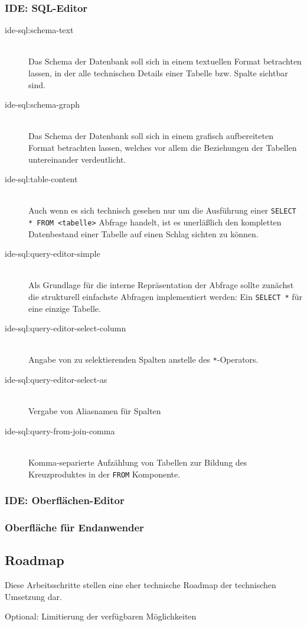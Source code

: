 \subsubsection{IDE: SQL-Editor}

\begin{description}
\item[ide-sql:schema-text] \hfill\\
  Das Schema der Datenbank soll sich in einem textuellen Format betrachten lassen, in der alle technischen Details einer Tabelle bzw. Spalte sichtbar sind.
\item[ide-sql:schema-graph] \hfill\\
  Das Schema der Datenbank soll sich in einem grafisch aufbereiteten Format betrachten lassen, welches vor allem die Beziehungen der Tabellen untereinander verdeutlicht.
\item[ide-sql:table-content] \hfill\\
  Auch wenn es sich technisch gesehen nur um die Ausführung einer \lstinline{SELECT * FROM <tabelle>} Abfrage handelt, ist es unerläßlich den kompletten Datenbestand einer Tabelle auf einen Schlag sichten zu können.
\item[ide-sql:query-editor-simple] \hfill\\
  Als Grundlage für die interne Repräsentation der Abfrage sollte zunächst die strukturell einfachste Abfragen implementiert werden: Ein \lstinline{SELECT *} für eine einzige Tabelle.
\item[ide-sql:query-editor-select-column] \hfill\\
  Angabe von zu selektierenden Spalten anstelle des \lstinline{*}-Operators.
\item[ide-sql:query-editor-select-as] \hfill\\
  Vergabe von Aliasnamen für Spalten
\item[ide-sql:query-from-join-comma] \hfill\\
  Komma-separierte Aufzählung von Tabellen zur Bildung des Kreuzproduktes in der \lstinline{FROM} Komponente.
\end{description}

\subsubsection{IDE: Oberflächen-Editor}

\subsubsection{Oberfläche für Endanwender}

\subsection{Roadmap}

Diese Arbeitsschritte stellen eine eher technische Roadmap der technischen Umsetzung dar.

\begin{description}

\item[Optional: Limitierung der verfügbaren Möglichkeiten] \hfill
\end{description}

